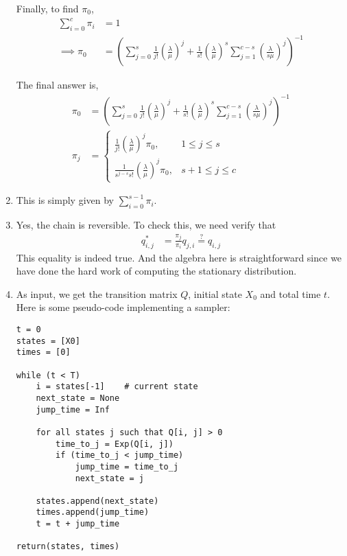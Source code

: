 \documentclass[11pt]{article}
\begin{document}
\begin{enumerate}
Finally, to find $\pi_0$,
\begin{align*}
	\sum_{i=0}^c \pi_i &= 1 \\
	\implies \pi_0 &=  \left( \sum_{j=0}^s \frac{1}{j!} \left(\frac{\lambda}{\mu}\right)^j  + \frac{1}{s!} \left(\frac{\lambda}{\mu}\right)^s \sum_{j=1}^{c-s} \left(\frac{\lambda}{s \mu} \right)^j \right)^{-1}
\end{align*}

The final answer is,
\begin{align*}
	\pi_0 &= \left( \sum_{j=0}^s \frac{1}{j!} \left(\frac{\lambda}{\mu}\right)^j  + \frac{1}{s!} \left(\frac{\lambda}{\mu}\right)^s \sum_{j=1}^{c-s} \left(\frac{\lambda}{s \mu} \right)^j \right)^{-1} \\
	\pi_j &= \begin{cases}
	\frac{1}{j!} \left(\frac{\lambda}{\mu}\right)^j \pi_0, & 1 \leq j \leq s \\
	\frac{1}{s^{j-s} s!} \left(\frac{\lambda}{\mu}\right)^j \pi_0, & s + 1 \leq j \leq c
	\end{cases}
\end{align*}

\item This is simply given by $\sum_{i=0}^{s-1} \pi_i$.

\item Yes, the chain is reversible. To check this, we need verify that
\begin{align*}
	q_{i, j}^{*} &= \frac{\pi_j}{ \pi_i} q_{j, i} \stackrel{?}{=} q_{i, j}
\end{align*}
This equality is indeed true. And the algebra here is straightforward since we have done the hard work of computing the stationary distribution.

\item As input, we get the transition matrix $Q$, initial state $X_0$ and total time $t$. Here is some pseudo-code implementing a sampler:
\begin{verbatim}
t = 0
states = [X0]
times = [0]

while (t < T)
    i = states[-1]    # current state
    next_state = None
    jump_time = Inf

    for all states j such that Q[i, j] > 0
        time_to_j = Exp(Q[i, j])
        if (time_to_j < jump_time)
            jump_time = time_to_j
            next_state = j

    states.append(next_state)
    times.append(jump_time)
    t = t + jump_time

return(states, times)
\end{verbatim}


\end{enumerate}
\end{document}
